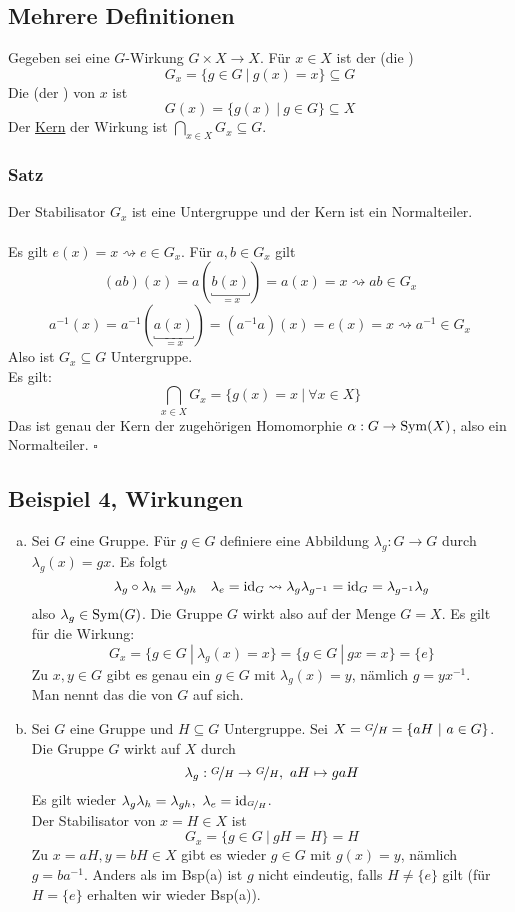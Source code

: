 \subsection{Mehrere Definitionen}
\label{sub:mehrere_def}
Gegeben sei eine $G$-Wirkung $G\times X\to X$. 
Für $x\in X$ ist der  (die )
\[
G_x=\{g\in G~|~g(x)=x \}\subseteq G 
\]
Die  (der ) von $x$ ist 
\[
G(x)=\{g(x)~|~g\in G \}\subseteq X 
\]
Der \uline{Kern} der Wirkung ist $\bigcap\limits_{x\in X}G_x\subseteq G$.

\subsubsection*{Satz}
Der Stabilisator $G_x$ ist eine Untergruppe und der Kern ist ein Normalteiler.\\

\\
Es gilt $e(x)=x \rightsquigarrow e\in G_x$. 
Für $a,b\in G_x$ gilt 
\[
(ab)(x)=a(\underbracket{b(x)}_{=x})=a(x)=x \rightsquigarrow ab\in G_x
\]
\[
a^{-1}(x)=a^{-1}(\underbracket{a(x)}_{=x})=(a^{-1}a)(x)=e(x)=x \rightsquigarrow a^{-1}\in G_x 
\]
Also ist $G_x\subseteq G$ Untergruppe.\\
Es gilt: 
\[
\bigcap\limits_{x\in X}G_x=\{g(x)=x~|~\forall x\in X \} 
\]
Das ist genau der Kern der zugehörigen Homomorphie $\alpha:G\to \operatorname{Sym}(X)$, also ein Normalteiler.
\hfill $\square$

\subsection{Beispiel 4, Wirkungen}
\label{sub:bsp_wirkungen}
\begin{enumerate}[(a)]
	\item Sei $G$ eine Gruppe. 
	Für $g\in G$ definiere eine Abbildung $\lambda_g:G\to G$ durch $\lambda_g(x)=gx$. 
	Es folgt
	\[
	\lambda_g\circ\lambda_h=\lambda_{gh} \quad \lambda_e=\operatorname{id}_G \rightsquigarrow \lambda_g\lambda_{g^{-1}}=\operatorname{id}_G=\lambda_{g^{-1}}\lambda_g 
	\]
	also $\lambda_g\in \operatorname{Sym}(G)$. 
	Die Gruppe $G$ wirkt also auf der Menge $G=X$. 
	Es gilt für die Wirkung:
	\[
	G_x=\{g\in G~|~\lambda_g(x)=x \}=\{g\in G~|~gx=x \}=\{e\} 
	\]
	Zu $x,y\in G$ gibt es genau ein $g\in G$ mit $\lambda_g(x)=y$, nämlich $g=yx^{-1}$.\\
	Man nennt das die  von $G$ auf sich.
	\item Sei $G$ eine Gruppe und $H\subseteq G$ Untergruppe. 
	Sei $X=\nicefrac{G}{H}=\{aH~|~a\in G \}$. 
	Die Gruppe $G$ wirkt auf $X$ durch 
	\[
	\lambda_g:\nicefrac{G}{H}\to \nicefrac{G}{H},~aH\mapsto gaH 
	\]
	Es gilt wieder $\lambda_g\lambda_h=\lambda_{gh},~\lambda_e=\operatorname{id}_{\nicefrac{G}{H}}$.\\
	Der Stabilisator von $x=H\in X$ ist 
	\[
	G_x=\{g\in G~|~gH=H \}=H 
	\]
	Zu $x=aH,y=bH\in X$ gibt es wieder $g\in G$ mit $g(x)=y$, nämlich $g=ba^{-1}$. 
	Anders als im Bsp(a) ist $g$ nicht eindeutig, falls $H\not= \{e\}$ gilt (für $H=\{e\}$ erhalten wir wieder Bsp(a)). 
\end{enumerate}


